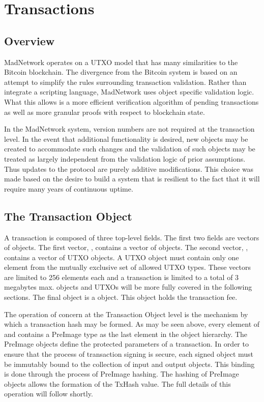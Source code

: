 \section{Transactions}
\subsection{Overview}



MadNetwork operates on a UTXO model that has many similarities to the
Bitcoin blockchain.
The divergence from the Bitcoin system is based on an attempt to
simplify the rules surrounding transaction validation.
Rather than integrate a scripting language, MadNetwork uses object
specific validation logic.
What this allows is a more efficient verification algorithm of pending
transactions as well as more granular proofs with respect to blockchain
state.

In the MadNetwork system, version numbers are not required at the
transaction level.
In the event that additional functionality is desired, new objects may
be created to accommodate such changes and the validation of such
objects may be treated as largely independent from the validation logic
of prior assumptions.
Thus updates to the protocol are purely additive modifications.
This choice was made based on the desire to build a system that is
resilient to the fact that it will require many years of continuous
uptime.


\subsection{The Transaction Object}

A transaction is composed of three top-level fields.
The first two fields are vectors of objects.
The first vector, \Vin{}, contains a vector of \TxIn{} objects.
The second vector, \Vout{}, contains a vector of UTXO objects.
A UTXO object must contain only one element from the mutually exclusive set of
allowed UTXO types.
These vectors are limited to 256 elements each and a transaction is limited to
a total of 3 megabytes max.
\TxIn{} objects and UTXOs will be more fully covered in the following sections.
The final object is a \Fee{} object.
This object holds the transaction fee.

The operation of concern at the Transaction Object level is the mechanism by
which a transaction hash may be formed.
As may be seen above, every element of \Vin{} and \Vout{} contains
a PreImage type as
the last element in the object hierarchy.
The PreImage objects define the protected parameters of a transaction.
In order to ensure that the process of transaction signing is secure, each
signed object must be immutably bound to the collection of input and output
objects.
This binding is done through the process of PreImage hashing.
The hashing of PreImage objects allows the formation of the TxHash value.
The full details of this operation will follow shortly.

